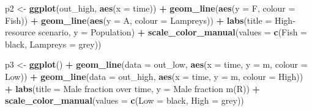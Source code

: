 \documentclass[
]{article}
\newenvironment{Shaded}{\begin{snugshade}}{\end{snugshade}}
\newcommand{\AttributeTok}[1]{\textcolor[rgb]{0.13,0.29,0.53}{#1}}
\newcommand{\FunctionTok}[1]{\textcolor[rgb]{0.13,0.29,0.53}{\textbf{#1}}}
\newcommand{\NormalTok}[1]{#1}
\newcommand{\OtherTok}[1]{\textcolor[rgb]{0.56,0.35,0.01}{#1}}
\newcommand{\SpecialCharTok}[1]{\textcolor[rgb]{0.81,0.36,0.00}{\textbf{#1}}}
\newcommand{\StringTok}[1]{\textcolor[rgb]{0.31,0.60,0.02}{#1}}
\begin{document}
\begin{Shaded}
\begin{Highlighting}[]
\NormalTok{p2 }\OtherTok{\textless{}{-}} \FunctionTok{ggplot}\NormalTok{(out\_high, }\FunctionTok{aes}\NormalTok{(}\AttributeTok{x =}\NormalTok{ time)) }\SpecialCharTok{+}
  \FunctionTok{geom\_line}\NormalTok{(}\FunctionTok{aes}\NormalTok{(}\AttributeTok{y =}\NormalTok{ F, }\AttributeTok{colour =} \StringTok{\textquotesingle{}Fish\textquotesingle{}}\NormalTok{)) }\SpecialCharTok{+}
  \FunctionTok{geom\_line}\NormalTok{(}\FunctionTok{aes}\NormalTok{(}\AttributeTok{y =}\NormalTok{ A, }\AttributeTok{colour =} \StringTok{\textquotesingle{}Lampreys\textquotesingle{}}\NormalTok{)) }\SpecialCharTok{+}
  \FunctionTok{labs}\NormalTok{(}\AttributeTok{title =} \StringTok{\textquotesingle{}High{-}resource scenario\textquotesingle{}}\NormalTok{, }\AttributeTok{y =} \StringTok{\textquotesingle{}Population\textquotesingle{}}\NormalTok{) }\SpecialCharTok{+}
  \FunctionTok{scale\_color\_manual}\NormalTok{(}\AttributeTok{values =} \FunctionTok{c}\NormalTok{(}\StringTok{\textquotesingle{}Fish\textquotesingle{}} \OtherTok{=} \StringTok{\textquotesingle{}black\textquotesingle{}}\NormalTok{, }\StringTok{\textquotesingle{}Lampreys\textquotesingle{}} \OtherTok{=} \StringTok{\textquotesingle{}grey\textquotesingle{}}\NormalTok{))}

\NormalTok{p3 }\OtherTok{\textless{}{-}} \FunctionTok{ggplot}\NormalTok{() }\SpecialCharTok{+}
  \FunctionTok{geom\_line}\NormalTok{(}\AttributeTok{data =}\NormalTok{ out\_low, }\FunctionTok{aes}\NormalTok{(}\AttributeTok{x =}\NormalTok{ time, }\AttributeTok{y =}\NormalTok{ m, }\AttributeTok{colour =} \StringTok{\textquotesingle{}Low\textquotesingle{}}\NormalTok{)) }\SpecialCharTok{+}
  \FunctionTok{geom\_line}\NormalTok{(}\AttributeTok{data =}\NormalTok{ out\_high, }\FunctionTok{aes}\NormalTok{(}\AttributeTok{x =}\NormalTok{ time, }\AttributeTok{y =}\NormalTok{ m, }\AttributeTok{colour =} \StringTok{\textquotesingle{}High\textquotesingle{}}\NormalTok{)) }\SpecialCharTok{+}
  \FunctionTok{labs}\NormalTok{(}\AttributeTok{title =} \StringTok{\textquotesingle{}Male fraction over time\textquotesingle{}}\NormalTok{, }\AttributeTok{y =} \StringTok{\textquotesingle{}Male fraction m(R)\textquotesingle{}}\NormalTok{) }\SpecialCharTok{+}
  \FunctionTok{scale\_color\_manual}\NormalTok{(}\AttributeTok{values =} \FunctionTok{c}\NormalTok{(}\StringTok{\textquotesingle{}Low\textquotesingle{}} \OtherTok{=} \StringTok{\textquotesingle{}black\textquotesingle{}}\NormalTok{, }\StringTok{\textquotesingle{}High\textquotesingle{}} \OtherTok{=} \StringTok{\textquotesingle{}grey\textquotesingle{}}\NormalTok{))}
\end{Highlighting}
\end{Shaded}
\end{document}
